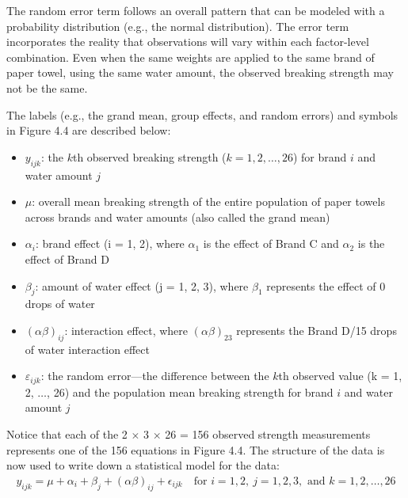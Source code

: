 \documentclass[
]{report}
\begin{document}
The random error term follows an overall pattern that can be modeled with a probability distribution (e.g., the normal distribution). The error term incorporates the reality that observations will vary within each factor-level combination. Even when the same weights are applied to the same brand of paper towel, using the same water amount, the observed breaking strength may not be the same.

The labels (e.g., the grand mean, group effects, and random errors) and symbols in Figure 4.4 are described below:

\vspace{-1em}
\begin{itemize}
\item $\scriptstyle y_{ijk}$: the $\scriptstyle k$th observed breaking strength ($\scriptstyle k = 1, 2, \ldots, 26$) for brand $\scriptstyle i$ and water amount $\scriptstyle j$
\item $\scriptstyle \mu$: overall mean breaking strength of the entire population of paper towels across brands and water amounts (also called the grand mean)
\item $\scriptstyle \alpha_i$: brand effect (i = 1, 2), where $\scriptstyle \alpha_1$ is the effect of Brand C and $\scriptstyle \alpha_2$ is the effect of Brand D
\item $\scriptstyle \beta_j$: amount of water effect (j = 1, 2, 3), where $\scriptstyle \beta_1$ represents the effect of 0 drops of water
\item $\scriptstyle (\alpha\beta)_{ij}$: interaction effect, where $\scriptstyle (\alpha\beta)_{23}$ represents the Brand D/15 drops of water interaction effect
\item $\scriptstyle \varepsilon_{ijk}$: the random error—the difference between the $\scriptstyle k$th observed value (k = 1, 2, $\ldots$, 26) and the population mean breaking strength for brand $\scriptstyle i$ and water amount $\scriptstyle j$
\end{itemize}

Notice that each of the 2 \(\times\) 3 \(\times\) 26 = 156 observed strength measurements represents one of the 156 equations in Figure 4.4. The structure of the data is now used to write down a statistical model for the data:
\begin{align}\label{4.5}
y_{ijk} = \mu + \alpha_i + \beta_j + (\alpha\beta)_{ij} + \epsilon_{ijk} \quad \text{for } i = 1,2,\ j = 1,2,3, \text{ and } k = 1,2,\ldots,26 \tag{4.5}
\end{align}
\end{document}
